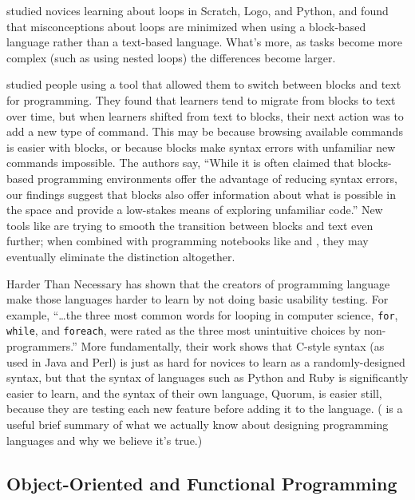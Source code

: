 \cite{Grov2017,Mlad2017} studied novices learning about loops in
Scratch, Logo, and Python, and found that misconceptions about loops are
minimized when using a block-based language rather than a text-based
language. What's more, as tasks become more complex (such as using
nested loops) the differences become larger.

\cite{Wein2017a} studied people using a tool that allowed them to
switch between blocks and text for programming. They found that
learners tend to migrate from blocks to text over time, but when
learners shifted from text to blocks, their next action was to add a
new type of command. This may be because browsing available commands
is easier with blocks, or because blocks make syntax errors with
unfamiliar new commands impossible. The authors say, ``While it is
often claimed that blocks-based programming environments offer the
advantage of reducing syntax errors, our findings suggest that blocks
also offer information about what is possible in the space and provide
a low-stakes means of exploring unfamiliar code.'' New tools like
 are trying to smooth the transition between blocks
and text even further; when combined with programming notebooks like
 and , they may eventually
eliminate the distinction altogether.

\begin{aside}{Harder Than Necessary}
  \cite{Stef2013} has shown that the creators of programming language
  make those languages harder to learn by not doing basic usability
  testing. For example, ``{\ldots}the three most common words for
  looping in computer science, \texttt{for}, \texttt{while}, and \texttt{foreach}, were rated
  as the three most unintuitive choices by non-programmers.'' More
  fundamentally, their work shows that C-style syntax (as used in Java
  and Perl) is just as hard for novices to learn as a randomly-designed
  syntax, but that the syntax of languages such as Python and Ruby is
  significantly easier to learn, and the syntax of their own language,
  Quorum, is easier still, because they are testing each new feature
  before adding it to the language. (\cite{Stef2017} is a useful
  brief summary of what we actually know about designing programming
  languages and why we believe it's true.)
\end{aside}

\subsection*{Object-Oriented and Functional Programming}

